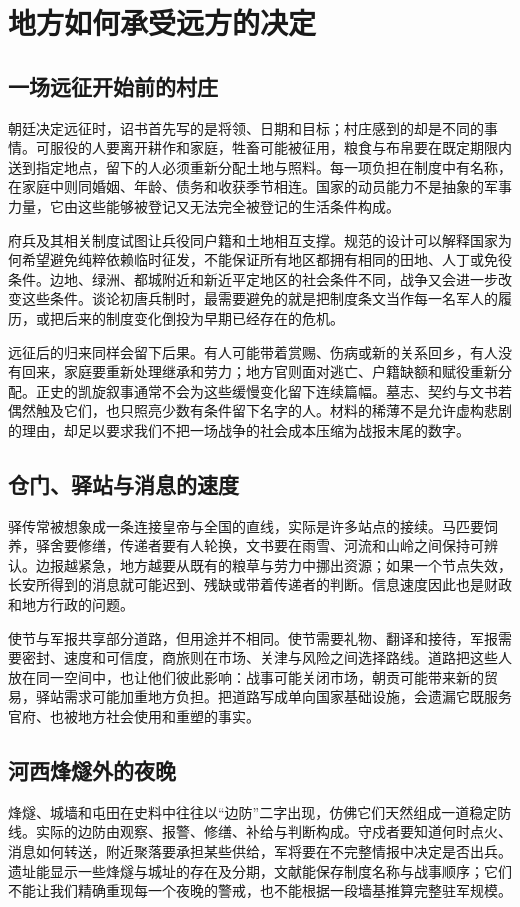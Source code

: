 \section{地方如何承受远方的决定}
\label{sec:early-tang-acceptance-depth-pages-three}

\subsection{一场远征开始前的村庄}
朝廷决定远征时，诏书首先写的是将领、日期和目标；村庄感到的却是不同的事情。可服役的人要离开耕作和家庭，牲畜可能被征用，粮食与布帛要在既定期限内送到指定地点，留下的人必须重新分配土地与照料。每一项负担在制度中有名称，在家庭中则同婚姻、年龄、债务和收获季节相连。国家的动员能力不是抽象的军事力量，它由这些能够被登记又无法完全被登记的生活条件构成。

府兵及其相关制度试图让兵役同户籍和土地相互支撑。规范的设计可以解释国家为何希望避免纯粹依赖临时征发，不能保证所有地区都拥有相同的田地、人丁或免役条件。边地、绿洲、都城附近和新近平定地区的社会条件不同，战争又会进一步改变这些条件。谈论初唐兵制时，最需要避免的就是把制度条文当作每一名军人的履历，或把后来的制度变化倒投为早期已经存在的危机。

远征后的归来同样会留下后果。有人可能带着赏赐、伤病或新的关系回乡，有人没有回来，家庭要重新处理继承和劳力；地方官则面对逃亡、户籍缺额和赋役重新分配。正史的凯旋叙事通常不会为这些缓慢变化留下连续篇幅。墓志、契约与文书若偶然触及它们，也只照亮少数有条件留下名字的人。材料的稀薄不是允许虚构悲剧的理由，却足以要求我们不把一场战争的社会成本压缩为战报末尾的数字。

\subsection{仓门、驿站与消息的速度}
驿传常被想象成一条连接皇帝与全国的直线，实际是许多站点的接续。马匹要饲养，驿舍要修缮，传递者要有人轮换，文书要在雨雪、河流和山岭之间保持可辨认。边报越紧急，地方越要从既有的粮草与劳力中挪出资源；如果一个节点失效，长安所得到的消息就可能迟到、残缺或带着传递者的判断。信息速度因此也是财政和地方行政的问题。

使节与军报共享部分道路，但用途并不相同。使节需要礼物、翻译和接待，军报需要密封、速度和可信度，商旅则在市场、关津与风险之间选择路线。道路把这些人放在同一空间中，也让他们彼此影响：战事可能关闭市场，朝贡可能带来新的贸易，驿站需求可能加重地方负担。把道路写成单向国家基础设施，会遗漏它既服务官府、也被地方社会使用和重塑的事实。

\subsection{河西烽燧外的夜晚}
烽燧、城墙和屯田在史料中往往以“边防”二字出现，仿佛它们天然组成一道稳定防线。实际的边防由观察、报警、修缮、补给与判断构成。守戍者要知道何时点火、消息如何转送，附近聚落要承担某些供给，军将要在不完整情报中决定是否出兵。遗址能显示一些烽燧与城址的存在及分期，文献能保存制度名称与战事顺序；它们不能让我们精确重现每一个夜晚的警戒，也不能根据一段墙基推算完整驻军规模。

